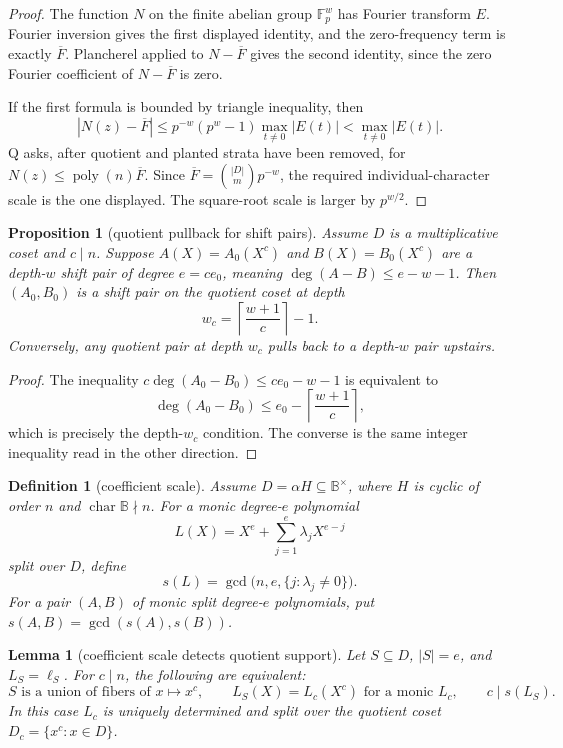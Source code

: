 \documentclass[a4paper,11pt]{amsart}
\newtheorem{lemma}[lemma]{Lemma}
\newtheorem{proposition}[proposition]{Proposition}
\newtheorem{definition}[definition]{Definition}
\theoremstyle{remark}
\newcommand{\F}{\mathbb F}
\newcommand{\B}{\mathbb B}
\newcommand{\poly}{\operatorname{poly}}
\begin{document}
\begin{proof}
The function \(N\) on the finite abelian group \(\F_p^w\) has Fourier transform \(E\).  Fourier inversion gives the first displayed identity, and the zero-frequency term is exactly \(\overline F\).  Plancherel applied to \(N-\overline F\) gives the second identity, since the zero Fourier coefficient of \(N-\overline F\) is zero.

If the first formula is bounded by triangle inequality, then
\[
        |N(z)-\overline F|\le p^{-w}(p^w-1)\max_{t\ne0}|E(t)|<\max_{t\ne0}|E(t)|.
\]
Q asks, after quotient and planted strata have been removed, for \(N(z)\le\poly(n)\overline F\).  Since \(\overline F=\binom{|D|}{m}p^{-w}\), the required individual-character scale is the one displayed.  The square-root scale is larger by \(p^{w/2}\).
\end{proof}

\begin{proposition}[quotient pullback for shift pairs]\label{prop:sp-pullback}
Assume \(D\) is a multiplicative coset and \(c\mid n\).  Suppose \(A(X)=A_0(X^c)\) and \(B(X)=B_0(X^c)\) are a depth-\(w\) shift pair of degree \(e=ce_0\), meaning \(\deg(A-B)\le e-w-1\).  Then \((A_0,B_0)\) is a shift pair on the quotient coset at depth
\[
        w_c=\left\lceil\frac{w+1}{c}\right\rceil-1.
\]
Conversely, any quotient pair at depth \(w_c\) pulls back to a depth-\(w\) pair upstairs.
\end{proposition}

\begin{proof}
The inequality \(c\deg(A_0-B_0)\le ce_0-w-1\) is equivalent to
\[
        \deg(A_0-B_0)\le e_0-\left\lceil\frac{w+1}{c}\right\rceil,
\]
which is precisely the depth-\(w_c\) condition.  The converse is the same integer inequality read in the other direction.
\end{proof}

\begin{definition}[coefficient scale]\label{def:coefficient-scale}
Assume \(D=\alpha H\subseteq\B^\times\), where \(H\) is cyclic of order \(n\) and \(\operatorname{char}\B\nmid n\).  For a monic degree-\(e\) polynomial
\[
        L(X)=X^e+\sum_{j=1}^e \lambda_jX^{e-j}
\]
split over \(D\), define
\[
        s(L)=\gcd\bigl(n,e,\{j:\lambda_j\ne0\}\bigr).
\]
For a pair \((A,B)\) of monic split degree-\(e\) polynomials, put \(s(A,B)=\gcd(s(A),s(B))\).
\end{definition}

\begin{lemma}[coefficient scale detects quotient support]\label{lem:coeff-scale}
Let \(S\subseteq D\), \(|S|=e\), and \(L_S=\ell_S\).  For \(c\mid n\), the following are equivalent:
\[
        S\text{ is a union of fibers of }x\mapsto x^c,\qquad
        L_S(X)=L_c(X^c)\text{ for a monic }L_c,\qquad
        c\mid s(L_S).
\]
In this case \(L_c\) is uniquely determined and split over the quotient coset \(D_c=\{x^c:x\in D\}\).
\end{lemma}
\end{document}
